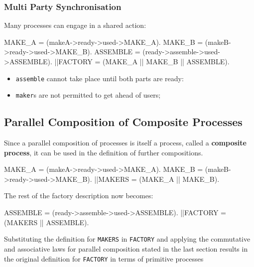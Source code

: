 \subsubsection{Multi Party Synchronisation}\label{sub:md_multi_party_synchhronisation} %
Many processes can engage in a shared action:
\begin{codeblock}[fsp]{}
    MAKE_A = (makeA->ready->used->MAKE_A).
    MAKE_B = (makeB->ready->used->MAKE_B).
    ASSEMBLE = (ready->assemble->used->ASSEMBLE).
    ||FACTORY = (MAKE_A || MAKE_B || ASSEMBLE).
\end{codeblock}
\begin{itemize}
    \item \texttt{assemble} cannot take place until both parts are ready:
    \item \texttt{maker}s are not permitted to get ahead of users;
\end{itemize}
%
\subsection{Parallel Composition of Composite Processes}\label{sub:md_parallel_composition_of_composite_processes} %
Since a parallel composition of processes is itself a process, called a \textbf{composite process}, it can be used in the definition of further compositions.
\begin{codeblock}[fsp]{}
    MAKE_A = (makeA->ready->used->MAKE_A).
    MAKE_B = (makeB->ready->used->MAKE_B).
    ||MAKERS = (MAKE_A || MAKE_B).
\end{codeblock}
The rest of the factory description now becomes:
\begin{codeblock}[fsp]{}
    ASSEMBLE = (ready->assemble->used->ASSEMBLE).
    ||FACTORY = (MAKERS || ASSEMBLE).
\end{codeblock}
\begin{warning}
    Substituting the definition for \texttt{MAKERS} in \texttt{FACTORY} and applying the commutative and associative laws for parallel composition stated in the last section results in the original definition for \texttt{FACTORY} in terms of primitive processes
\end{warning}
%
